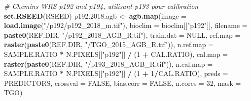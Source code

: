 \documentclass[a4paper, notitlepage, 12pt, krantz2]{krantz}
\newenvironment{Shaded}{\begin{snugshade}}{\end{snugshade}}
\newcommand{\CommentTok}[1]{\textcolor[rgb]{0.56,0.35,0.01}{\textit{#1}}}
\newcommand{\DataTypeTok}[1]{\textcolor[rgb]{0.13,0.29,0.53}{#1}}
\newcommand{\DecValTok}[1]{\textcolor[rgb]{0.00,0.00,0.81}{#1}}
\newcommand{\FloatTok}[1]{\textcolor[rgb]{0.00,0.00,0.81}{#1}}
\newcommand{\KeywordTok}[1]{\textcolor[rgb]{0.13,0.29,0.53}{\textbf{#1}}}
\newcommand{\NormalTok}[1]{#1}
\newcommand{\OperatorTok}[1]{\textcolor[rgb]{0.81,0.36,0.00}{\textbf{#1}}}
\newcommand{\OtherTok}[1]{\textcolor[rgb]{0.56,0.35,0.01}{#1}}
\newcommand{\StringTok}[1]{\textcolor[rgb]{0.31,0.60,0.02}{#1}}
\begin{document}
\begin{Shaded}
\begin{Highlighting}[]
{{{{\CommentTok{# Chemins WRS p192 and p194, utilisant p193 pour calibration}
\KeywordTok{set.RSEED}\NormalTok{(RSEED)}
\NormalTok{p192.}\FloatTok{2018.}\NormalTok{agb <-}\StringTok{ }\KeywordTok{agb.map}\NormalTok{(}\DataTypeTok{image     =} \KeywordTok{load.image}\NormalTok{(}\StringTok{"/p192/p192_2018_m.tif"}\NormalTok{), }
                         \DataTypeTok{bioclim   =}\NormalTok{ bioclim[[}\StringTok{"p192"}\NormalTok{]],}
                         \DataTypeTok{filename  =} \KeywordTok{paste0}\NormalTok{(REF.DIR, }\StringTok{"/p192_2018_AGB_R.tif"}\NormalTok{),}
                         \DataTypeTok{train.dat =} \OtherTok{NULL}\NormalTok{,}
                         \DataTypeTok{ref.map   =} \KeywordTok{raster}\NormalTok{(}\KeywordTok{paste0}\NormalTok{(REF.DIR, }\StringTok{"/TGO_2015_AGB_R.tif"}\NormalTok{)),}
                         \DataTypeTok{n.ref.map =}\NormalTok{ SAMPLE.RATIO }\OperatorTok{*}\StringTok{ }\NormalTok{N.PIXELS[[}\StringTok{"p192"}\NormalTok{]] }\OperatorTok{/}\StringTok{ }\NormalTok{(}\DecValTok{1} \OperatorTok{+}\StringTok{ }\NormalTok{CAL.RATIO),}
                         \DataTypeTok{cal.map   =} \KeywordTok{raster}\NormalTok{(}\KeywordTok{paste0}\NormalTok{(REF.DIR, }\StringTok{"/p193_2018_AGB_R.tif"}\NormalTok{)),}
                         \DataTypeTok{n.cal.map =}\NormalTok{ SAMPLE.RATIO }\OperatorTok{*}\StringTok{ }\NormalTok{N.PIXELS[[}\StringTok{"p192"}\NormalTok{]] }\OperatorTok{/}\StringTok{ }\NormalTok{(}\DecValTok{1} \OperatorTok{+}\StringTok{ }\DecValTok{1}\OperatorTok{/}\NormalTok{CAL.RATIO),}
                         \DataTypeTok{preds     =}\NormalTok{ PREDICTORS,}
                         \DataTypeTok{crossval  =} \OtherTok{FALSE}\NormalTok{,}
                         \DataTypeTok{bias.corr =} \OtherTok{FALSE}\NormalTok{,}
                         \DataTypeTok{n.cores   =} \DecValTok{32}\NormalTok{,}
                         \DataTypeTok{mask      =}\NormalTok{ TGO)}

}}}}
\end{Highlighting}
\end{Shaded}
\end{document}
